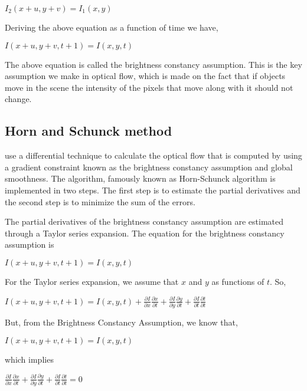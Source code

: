 \documentclass[a4paper]{aitthesis}
\begin{document}
\begin{center}
  $I_2(x+u, y+v) = I_1(x,y)$
\end{center}
 Deriving the above equation as a function of time we have,
\begin{center}
 $I(x+u, y+v, t+1) = I(x, y, t)$
\end{center}

The above equation is called the brightness constancy assumption. This is the  key assumption we make in optical flow, which is made on the fact that if objects move in the scene the intensity of the pixels that move along with it should not change.


\subsection{Horn and Schunck method}
 use a differential technique to calculate the optical flow that is computed by using a gradient constraint known as the brightness constancy assumption and global smoothness. The algorithm, famously known as Horn-Schunck algorithm is implemented in two steps. The first step is to estimate the partial derivatives and the second step is to minimize the sum of the errors.

The partial derivatives of the brightness constancy assumption are estimated through a Taylor series expansion.
The equation for the brightness constancy assumption is
\begin{center}
 $I(x+u, y+v, t+1) = I(x,y,t)$
\end{center}


For the Taylor series expansion, we assume that $x$ and $y$ as functions of $t$. So, 
\begin{center}
$I(x+u, y+v, t+1) = I(x,y,t) + \frac{\partial I}{\partial x}\frac{\partial x}{\partial t} + \frac{\partial I}{\partial y}\frac{\partial y}{\partial t} + \frac{\partial I}{\partial t}\frac{\partial t}{\partial t}$ 
\end{center}

But, from the Brightness Constancy Assumption, we know that, 
\begin{center}
$I(x+u, y+v, t+1) = I(x,y,t)$ 
\end{center}
 
 which implies 
\begin{center}
 $\frac{\partial I}{\partial x}\frac{\partial x}{\partial t} + \frac{\partial I}{\partial y}\frac{\partial y}{\partial t} + \frac{\partial I}{\partial t}\frac{\partial t}{\partial t} = 0$
\end{center}
 
\end{document}
